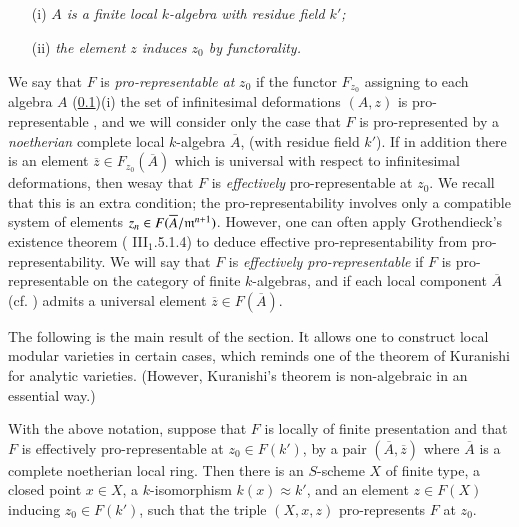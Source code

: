 \subsection{}\label{art02-sec5.1}
\begin{itemize}
\item[(i)] {\em $A$ is a finite local $k$-algebra with residue field $k'$;}

\item[(ii)] {\em the element $z$ induces $z_{0}$ by functorality.}
\end{itemize}
We say that $F$ is {\em pro-representable at} $z_{0}$ if the functor $F_{z_{0}}$ assigning to each algebra $A$ (\ref{art02-sec5.1})(i) the set of infinitesimal deformations $(A,z)$ is pro-representable \cite{art02-key11}, and we will consider only the case that $F$ is pro-represented by a {\em noetherian} complete local $k$-algebra $\overline{A}$, (with residue field $k'$). If in addition there is an element $\overline{z}\in F_{z_{0}}(\overline{A})$ which is universal with respect to infinitesimal deformations, then we\pageoriginale say that $F$ is {\em effectively} pro-representable at $z_{0}$. We recall that this is an extra condition; the pro-representability involves only a compatible system of elements $z_{n}\in F(\overline{A}/\mathfrak{m}^{n+1})$. However, one can often apply Grothendieck's existence theorem (\cite{art02-key8} III$_{1}$.5.1.4) to deduce effective pro-representability from pro-representability. We will say that $F$ is {\em effectively pro-representable} if $F$ is pro-representable on the category of finite $k$-algebras, and if each local component $\overline{A}$ (cf. \cite{art02-key11}) admits a universal element $\overline{z}\in F(\overline{A})$.

The following is the main result of the section. It allows one to construct local modular varieties in certain cases, which reminds one of the theorem of Kuranishi \cite{art02-key20} for analytic varieties. (However, Kuranishi's theorem is non-algebraic in an essential way.)

\setcounter{theorem}{1}
\begin{theorem}\label{art02-thm5.2}
With the above notation, suppose that $F$ is locally of finite presentation and that $F$ is effectively pro-representable at $z_{0}\in F(k')$, by a pair $(\overline{A},\overline{z})$ where $\overline{A}$ is a complete noetherian local ring. Then there is an $S$-scheme $X$ of finite type, a closed point $x\in X$, a $k$-isomorphism $k(x)\approx k'$, and an element $z\in F(X)$ inducing $z_{0}\in F(k')$, such that the triple $(X,x,z)$ pro-represents $F$ at $z_{0}$.
\end{theorem}

